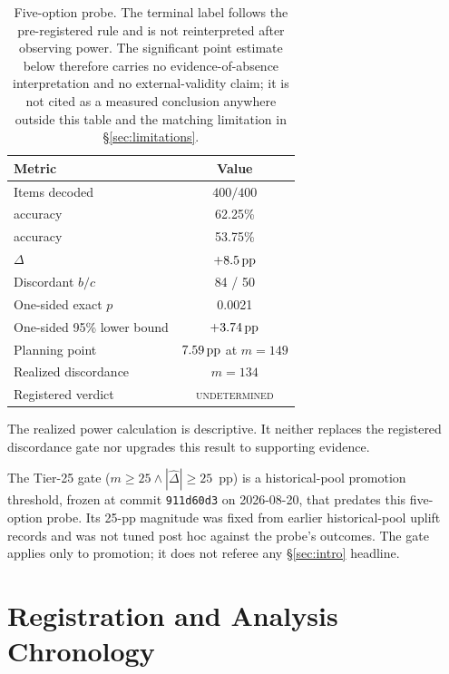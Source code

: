 \begin{table}[H]
\centering
\small
\caption{Five-option probe.  The terminal label follows the pre-registered
rule and is not reinterpreted after observing power.  The significant point
estimate below therefore carries no evidence-of-absence interpretation and no
external-validity claim; it is not cited as a measured conclusion anywhere
outside this table and the matching limitation in \S\ref{sec:limitations}.}
\label{tab:5option}
\begin{tabular}{@{}lc@{}}
\toprule
Metric & Value \\
\midrule
Items decoded & $400/400$ \\
\sconf{} accuracy & 62.25\% \\
\rinj{} accuracy & 53.75\% \\
$\Delta$ & $+8.5\,\mathrm{pp}$ \\
Discordant $b/c$ & 84 / 50 \\
One-sided exact $p$ & 0.0021 \\
One-sided 95\% lower bound & $+3.74\,\mathrm{pp}$ \\
Planning point & $7.59\,\mathrm{pp}$ at $m=149$ \\
Realized discordance & $m=134$ \\
Registered verdict & \textsc{undetermined} \\
\bottomrule
\end{tabular}
\end{table}

The realized power calculation is descriptive.  It neither replaces the
registered discordance gate nor upgrades this result to supporting evidence.

The Tier-25 gate ($m \ge 25 \wedge |\widehat{\Delta}| \ge 25$~pp) is a
historical-pool promotion threshold, frozen at commit \texttt{911d60d3} on
2026-08-20, that predates this five-option probe.  Its 25-pp magnitude was
fixed from earlier historical-pool uplift records and was not tuned post hoc
against the probe's outcomes.  The gate applies only to promotion; it does
not referee any \S\ref{sec:intro} headline.

\section{Registration and Analysis Chronology}
\label{app:revision}

